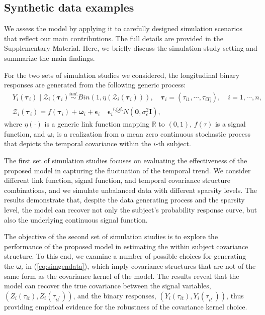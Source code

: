\subsection{Synthetic data examples}
\label{subsec:simstudy}

We assess the model by applying it to carefully designed simulation scenarios that reflect 
our main contributions. The full details are provided in the Supplementary Material. Here, 
we briefly discuss the simulation study setting and summarize the main findings.

For the two sets of simulation studies we considered, the 
longitudinal binary responses are generated from the following generic process:
\begin{equation}
    \begin{split}
    &%
    Y_i(\boldsymbol{\tau}_{i}) \mid \mathcal{Z}_i(\boldsymbol{\tau}_{i}) \stackrel{ind.}{\sim} 
    Bin(1,\eta(\mathcal{Z}_i(\boldsymbol{\tau}_{i}))), \quad \boldsymbol{\tau}_i=(\tau_{i1},\cdots,\tau_{iT_i}),\quad i=1,\cdots,n,\\
    & \mathcal{Z}_i(\boldsymbol{\tau}_{i}) %
    =f(\boldsymbol{\tau}_i)+\boldsymbol{\omega}_i+\boldsymbol{\epsilon}_i\quad \boldsymbol{\epsilon}_i\stackrel{i.i.d.}{\sim} N(\mathbf{0},\sigma_{\epsilon}^2\mathbf{I}),
    \end{split}   
    \label{eq:simgendata}
\end{equation}
where $\eta(\cdot)$ is a generic link function mapping $\mathbb{R}$ to $(0,1)$, $f(\tau)$ 
is a signal function, and $\boldsymbol{\omega}_i$ is a realization from a mean zero 
continuous stochastic process that depicts the temporal covariance within the $i$-th subject. 


The first set of simulation studies focuses on evaluating the effectiveness of the 
proposed model in capturing the fluctuation of the temporal trend. We consider 
different link function, signal function, and temporal covariance structure combinations, 
and we simulate unbalanced data with different sparsity levels. The results demonstrate 
that, despite the data generating process and the sparsity level, the model can 
recover not only the subject's probability response curve, but also the underlying 
continuous signal function.   


The objective of the second set of simulation studies is to explore the performance 
of the proposed model in estimating the within subject covariance structure. To this end, 
we examine a number of possible choices for generating the $\boldsymbol{\omega}_i$ 
in (\ref{eq:simgendata}), which imply covariance structures that are not of the 
same form as the covariance kernel of the model. The results reveal that the model 
can recover the true covariance between the signal variables, 
$(Z_i(\tau_{it}),Z_i(\tau_{i t^{\prime}}))$, and the binary 
responses, $(Y_i(\tau_{it}),Y_i(\tau_{i t^{\prime}}))$, thus providing empirical 
evidence for the robustness of the covariance kernel choice. 


